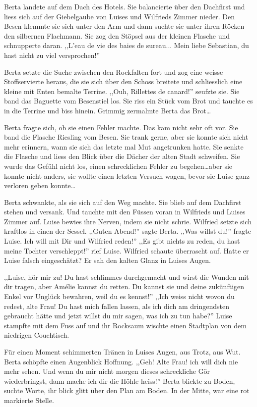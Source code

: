 Berta landete auf dem Dach des Hotels. Sie balancierte über den Dachfirst und liess sich auf der Giebelgaube von Luises und Wilfrieds Zimmer nieder. Den Besen klemmte sie sich unter den Arm und dann suchte sie unter ihren Röcken den silbernen Flachmann. Sie zog den Stöpsel aus der kleinen Flasche und schnupperte daran. ,,L'eau de vie des baies de sureau... Mein liebe Sebastian, du hast nicht zu viel versprochen!'' 

Berta setzte die Suche zwischen den Rockfalten fort und zog eine weisse Stoffservierte heraus, die sie sich über den Schoss breitete und schliesslich eine kleine mit Enten bemalte Terrine. ,,Ouh, Rillettes de canard!'' seufzte sie. Sie band das Baguette vom Besenstiel los. Sie riss ein Stück vom Brot und tauchte es in die Terrine und biss hinein. Grimmig zermalmte Berta das Brot\dots 

Berta fragte sich, ob sie einen Fehler machte. Das kam nicht sehr oft vor. Sie band die Flasche Riesling vom Besen. Sie trank gerne, aber sie konnte sich nicht mehr erinnern, wann sie sich das letzte mal Mut angetrunken hatte. Sie senkte die Flasche und liess den Blick über die Dächer der alten Stadt schweifen. Sie wurde das Gefühl nicht los, einen schrecklichen Fehler zu begehen\dots aber sie konnte nicht anders, sie wollte einen letzten Versuch wagen, bevor sie Luise ganz verloren geben konnte\dots 

Berta schwankte, als sie sich auf den Weg machte. Sie blieb auf dem Dachfirst stehen und versank. Und tauchte mit den Füssen voran in Wilfrieds und Luises Zimmer auf. Luise bewies ihre Nerven, indem sie nicht schrie. Wilfried setzte sich kraftlos in einen der Sessel. ,,Guten Abend!'' sagte Berta. ,,Was willst du!'' fragte Luise. Ich will mit Dir und Wilfried reden!'' ,,Es gibt nichts zu reden, du hast meine Tochter verschleppt!'' rief Luise. Wilfried schaute überrascht auf. Hatte er Luise falsch eingeschätzt? Er sah den kalten Glanz in Luises Augen. 

,,Luise, hör mir zu! Du hast schlimmes durchgemacht und wirst die Wunden mit dir tragen, aber Amélie kannst du retten. Du kannst sie und deine zukünftigen Enkel vor Unglück bewahren, weil du es kennst!'' ,,Ich weiss nicht wovon du redest, alte Frau! Du hast mich fallen lassen, als ich dich am dringendsten gebraucht hätte und jetzt willst du mir sagen, was ich zu tun habe?'' Luise stampfte mit dem Fuss auf und ihr Rocksaum wischte einen Stadtplan von dem niedrigen Couchtisch. 

Für einen Moment schimmerten Tränen in Luises Augen, aus Trotz, aus Wut. Berta schöpfte einen Augenblick Hoffnung. ,,Geh! Alte Frau! ich will dich nie mehr sehen. Und wenn du mir nicht morgen dieses schreckliche Gör wiederbringst, dann mache ich dir die Höhle heiss!'' Berta blickte zu Boden, suchte Worte, ihr blick glitt über den Plan am Boden. In der Mitte, war eine rot markierte Stelle. 

